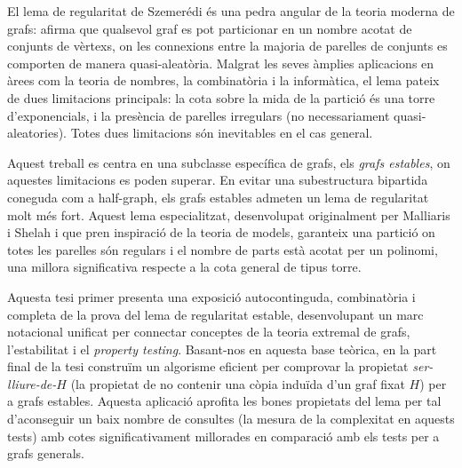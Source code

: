 \documentclass[11pt]{article}
\begin{document}
    El lema de regularitat de Szemerédi és una pedra angular de la teoria moderna de grafs: afirma que qualsevol graf
    es pot particionar en un nombre acotat de conjunts de vèrtexs, on les connexions entre la majoria de parelles de
    conjunts es comporten de manera quasi-aleatòria.
    Malgrat les seves àmplies aplicacions en àrees com la teoria de nombres, la combinatòria i la informàtica,
    el lema pateix de dues limitacions principals: la cota sobre la mida de la partició és una torre d'exponencials,
    i la presència de parelles irregulars (no necessariament quasi-aleatories).
    Totes dues limitacions són inevitables en el cas general.

    Aquest treball es centra en una subclasse específica de grafs, els \emph{grafs estables}, on aquestes limitacions
    es poden superar.
    En evitar una subestructura bipartida coneguda com a half-graph, els grafs estables admeten un lema de regularitat
    molt més fort.
    Aquest lema especialitzat, desenvolupat originalment per Malliaris i Shelah i que pren inspiració de la teoria de models,
    garanteix una partició on totes les parelles són regulars i el nombre de parts està acotat per un polinomi,
    una millora significativa respecte a la cota general de tipus torre.

    Aquesta tesi primer presenta una exposició autocontinguda, combinatòria i completa de la prova del lema de
    regularitat estable, desenvolupant un marc notacional unificat per connectar conceptes de la teoria extremal
    de grafs, l'estabilitat i el \emph{property testing}.
    Basant-nos en aquesta base teòrica, en la part final de la tesi construïm un algorisme eficient per comprovar la
    propietat \emph{ser-lliure-de-$H$} (la propietat de no contenir una còpia induïda d'un graf fixat $H$) per a grafs estables.
    Aquesta aplicació aprofita les bones propietats del lema per tal d'aconseguir un baix nombre de consultes (la mesura
    de la complexitat en aquests tests) amb cotes significativament millorades en comparació amb els tests per a grafs
    generals.
\end{document}
